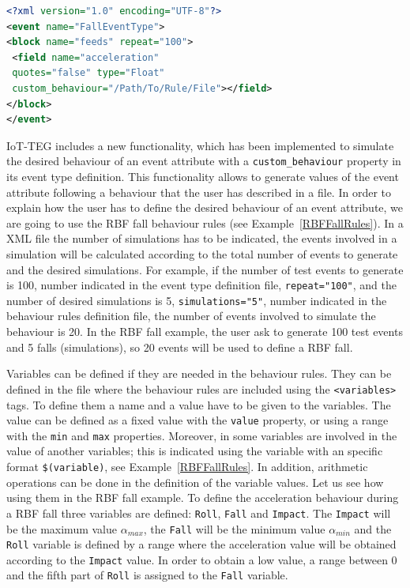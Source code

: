 \documentclass[conference]{IEEEtran}
\theoremstyle{definition}
\begin{document}
\begin{lstlisting}[basicstyle=\ttfamily\footnotesize,language=XML,caption={Fall event type definition},label=FallEvent]
<?xml version="1.0" encoding="UTF-8"?>
<event name="FallEventType">
<block name="feeds" repeat="100">
 <field name="acceleration" 
 quotes="false" type="Float" 
 custom_behaviour="/Path/To/Rule/File"></field>
</block>
</event>
\end{lstlisting}

IoT-TEG includes a new functionality, which has been implemented to simulate the desired behaviour of an 
event attribute with a \texttt{custom\_behaviour} property in its event type definition. This functionality 
allows to generate values of the event attribute following a behaviour that the user has described in a file.
In order to explain how the user has to define the desired behaviour of an event attribute, we are going
to use the RBF fall behaviour rules (see Example~\ref{RBFFallRules}). In a XML file the number of simulations has to be
indicated, the events involved in a simulation will be calculated according to the total number of events
to generate and the desired simulations. For example, if the number of test events to generate is 100, 
number indicated in the event type definition file, \texttt{repeat="100"}, and the number of desired 
simulations is 5, \texttt{simulations="5"}, number indicated in the behaviour rules definition file, 
the number of events involved to simulate the behaviour is 20. In the RBF fall example, the user ask to 
generate 100 test events and 5 falls (simulations), so 20 events will be used to define a RBF fall.

Variables can be defined if they are needed in the behaviour rules. They can be defined in the file where
the behaviour rules are included using the \texttt{<variables>} tags. To define them a name and a value 
have to be given to the variables. The value can be defined as a fixed value with the \texttt{value} 
property, or using a range with the \texttt{min} and \texttt{max} properties. Moreover, in some variables
are involved in the value of another variables; this is indicated using the variable with an specific 
format \texttt{\$(variable)}, see Example~\ref{RBFFallRules}. In addition, arithmetic operations can be 
done in the definition of the variable values. Let us see how using them in the RBF fall example. To 
define the acceleration behaviour during a RBF fall three variables are defined: \texttt{Roll}, 
\texttt{Fall} and \texttt{Impact}. The \texttt{Impact} will be the maximum value $\alpha_{max}$, the 
\texttt{Fall} will be the minimum value $\alpha_{min}$ and the \texttt{Roll} variable is defined by a 
range where the acceleration value will be obtained according to the \texttt{Impact} value. In order to
obtain a low value, a range between 0 and the fifth part of \texttt{Roll} is assigned to the \texttt{Fall} 
variable.
\end{document}
